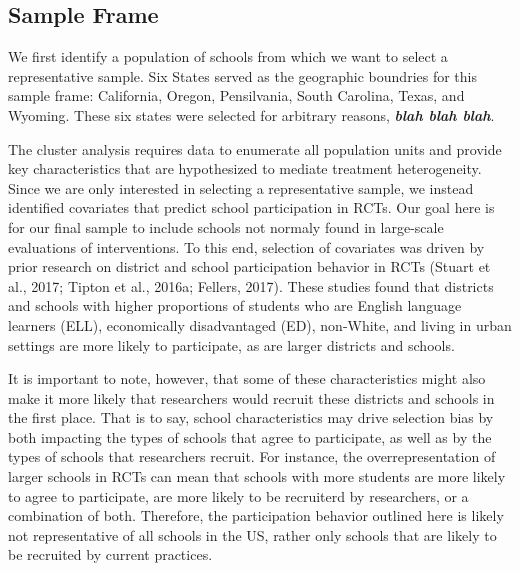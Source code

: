\documentclass[man,floatsintext]{apa6}
\begin{document}
\hypertarget{sample-frame}{%
\subsection{Sample Frame}\label{sample-frame}}

We first identify a population of schools from which we want to select a representative sample. Six States served as the geographic boundries for this sample frame: California, Oregon, Pensilvania, South Carolina, Texas, and Wyoming. These six states were selected for arbitrary reasons, \textbf{\emph{blah blah blah}}.

The cluster analysis requires data to enumerate all population units and provide key characteristics that are hypothesized to mediate treatment heterogeneity. Since we are only interested in selecting a representative sample, we instead identified covariates that predict school participation in RCTs. Our goal here is for our final sample to include schools not normaly found in large-scale evaluations of interventions. To this end, selection of covariates was driven by prior research on district and school participation behavior in RCTs (Stuart et al., 2017; Tipton et al., 2016a; Fellers, 2017). These studies found that districts and schools with higher proportions of students who are English language learners (ELL), economically disadvantaged (ED), non-White, and living in urban settings are more likely to participate, as are larger districts and schools.

It is important to note, however, that some of these characteristics might also make it more likely that researchers would recruit these districts and schools in the first place. That is to say, school characteristics may drive selection bias by both impacting the types of schools that agree to participate, as well as by the types of schools that researchers recruit. For instance, the overrepresentation of larger schools in RCTs can mean that schools with more students are more likely to agree to participate, are more likely to be recruiterd by researchers, or a combination of both. Therefore, the participation behavior outlined here is likely not representative of all schools in the US, rather only schools that are likely to be recruited by current practices.
\end{document}
